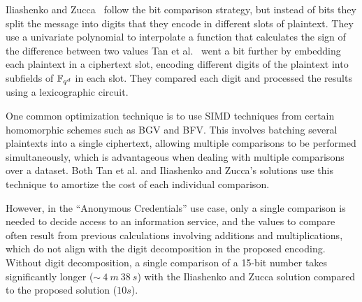 Iliashenko and Zucca~\cite{iliashenkoFasterHomomorphicComparison2021} follow the bit comparison strategy, but instead of bits they split the message into digits that they encode in different slots of plaintext. They use a univariate polynomial to interpolate a function that calculates the sign of the difference between two values
Tan et al.~\cite{tanEfficientPrivateComparison2020} went a bit further by embedding each plaintext in a ciphertext slot, encoding different digits of the plaintext into subfields of $\mathbb{F}_{q^d}$ in each slot. They compared each digit and processed the results using a lexicographic circuit.

One common optimization technique is to use SIMD techniques from certain homomorphic schemes such as BGV and BFV. This involves batching several plaintexts into a single ciphertext, allowing multiple comparisons to be performed simultaneously, which is advantageous when dealing with multiple comparisons over a dataset. Both Tan et al. and Iliashenko and Zucca's solutions use this technique to amortize the cost of each individual comparison.

However, in the ``Anonymous Credentials'' use case, only a single comparison is needed to decide access to an information service, and the values to compare often result from previous calculations involving additions and multiplications, which do not align with the digit decomposition in the proposed encoding. Without digit decomposition, a single comparison of a 15-bit number takes significantly longer ($\sim~4~m~38~s$) with the Iliashenko and Zucca solution compared to the proposed solution ($10s$).








